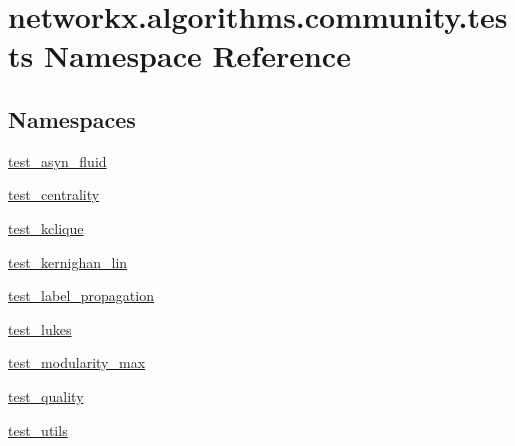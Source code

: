 \hypertarget{namespacenetworkx_1_1algorithms_1_1community_1_1tests}{}\section{networkx.\+algorithms.\+community.\+tests Namespace Reference}
\label{namespacenetworkx_1_1algorithms_1_1community_1_1tests}
\subsection*{Namespaces}
\begin{DoxyCompactItemize}
\item 
 \hyperlink{namespacenetworkx_1_1algorithms_1_1community_1_1tests_1_1test__asyn__fluid}{test\+\_\+asyn\+\_\+fluid}
\item 
 \hyperlink{namespacenetworkx_1_1algorithms_1_1community_1_1tests_1_1test__centrality}{test\+\_\+centrality}
\item 
 \hyperlink{namespacenetworkx_1_1algorithms_1_1community_1_1tests_1_1test__kclique}{test\+\_\+kclique}
\item 
 \hyperlink{namespacenetworkx_1_1algorithms_1_1community_1_1tests_1_1test__kernighan__lin}{test\+\_\+kernighan\+\_\+lin}
\item 
 \hyperlink{namespacenetworkx_1_1algorithms_1_1community_1_1tests_1_1test__label__propagation}{test\+\_\+label\+\_\+propagation}
\item 
 \hyperlink{namespacenetworkx_1_1algorithms_1_1community_1_1tests_1_1test__lukes}{test\+\_\+lukes}
\item 
 \hyperlink{namespacenetworkx_1_1algorithms_1_1community_1_1tests_1_1test__modularity__max}{test\+\_\+modularity\+\_\+max}
\item 
 \hyperlink{namespacenetworkx_1_1algorithms_1_1community_1_1tests_1_1test__quality}{test\+\_\+quality}
\item 
 \hyperlink{namespacenetworkx_1_1algorithms_1_1community_1_1tests_1_1test__utils}{test\+\_\+utils}
\end{DoxyCompactItemize}
